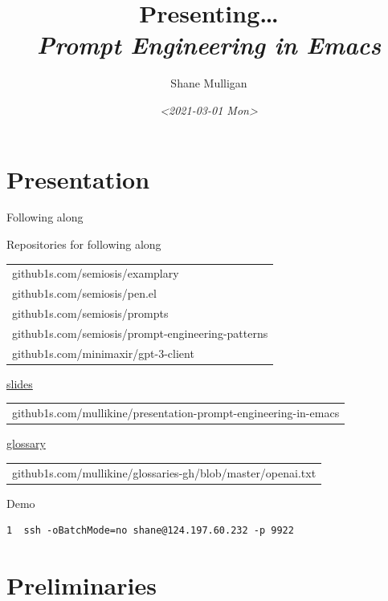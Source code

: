 \documentclass[presentation]{beamer}
\author{Shane Mulligan \\  }
\date{\textit{<2021-03-01 Mon>}}
\title{Presenting\ldots{} \\   \emph{\alert{Prompt Engineering in Emacs}} \\  }
\begin{document}
\maketitle

\section{Presentation}
\label{sec:org2b66a83}
\begin{frame}[label={sec:orgc02dd0d},fragile]{Following along}
 \begin{block}{Repositories for following along}
{\footnotesize

\begin{center}
\begin{tabular}{l}
github1s.com/semiosis/examplary\\
github1s.com/semiosis/pen.el\\
github1s.com/semiosis/prompts\\
github1s.com/semiosis/prompt-engineering-patterns\\
github1s.com/minimaxir/gpt-3-client\\
\end{tabular}
\end{center}
}

{\footnotesize
\uline{\alert{slides}}
\begin{center}
\begin{tabular}{l}
github1s.com/mullikine/presentation-prompt-engineering-in-emacs\\
\end{tabular}
\end{center}
}

{\footnotesize
\uline{\alert{glossary}}
\begin{center}
\begin{tabular}{l}
github1s.com/mullikine/glossaries-gh/blob/master/openai.txt\\
\end{tabular}
\end{center}
}
\end{block}

\begin{block}{Demo}
{\footnotesize
\begin{verbatim}
1  ssh -oBatchMode=no shane@124.197.60.232 -p 9922
\end{verbatim}
}
\end{block}
\end{frame}

\section{Preliminaries}
\label{sec:org958c2fc}
\end{document}
